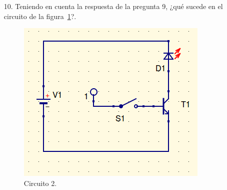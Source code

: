 \documentclass{article}
\begin{document}
\begin{itemize}
		\item [10.] Teniendo en cuenta la respuesta de la pregunta
		9, ¿qué sucede en el circuito de la figura~\ref{fig:2}?.

\begin{figure}[hptp]
    \centering
    \includegraphics[scale=0.35]{circuito1.png}
    \caption{Circuito 2.}
    \label{fig:2}
\end{figure}
\smallskip

\end{itemize}

%
\end{document}
